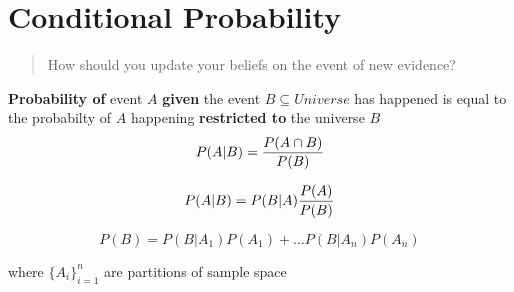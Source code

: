 \section{Conditional Probability}
\begin{slide} 
  \begin{quote}
     How should you update your beliefs on the event of new evidence?
  \end{quote}
  \textbf{Probability of} event $A$ \textbf{given} the event $B\subseteq Universe$ has happened is equal to the probabilty of $A$ happening \textbf{restricted to} the universe $B$
	$$P(A|B) = {P(A\cap B) \over P(B)}$$

\end{slide}
\begin{slide}
\begin{shaded}
\begin{equation}
  P(A|B) = P(B|A){P(A) \over P(B)}
\end{equation}
\end{shaded}
\end{slide}
\begin{slide}
\vspace{-1cm}
\begin{shaded}
\begin{equation}
  P(B) = P(B|A_1)P(A_1)+\ldots P(B|A_n)P(A_n)
\end{equation}
\end{shaded}
where $\{A_i\}_{i=1}^n$ are partitions of sample space
\end{slide}


\begin{slide}[ha]\end{slide}
